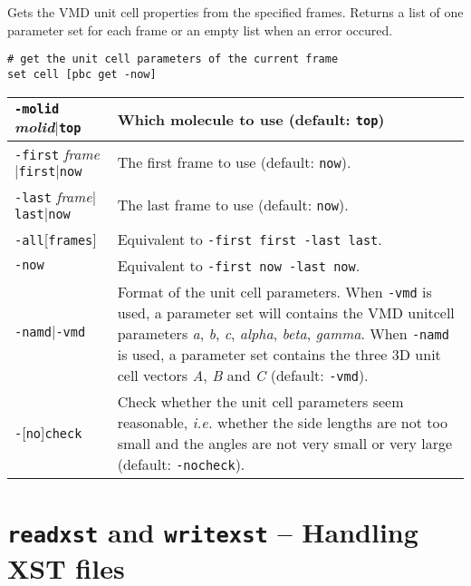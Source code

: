 \documentclass[a4paper, DIV12]{scrartcl}
\newcommand{\ie}{\emph{i.e.}\xspace}
\begin{document}
Gets the VMD unit cell properties from the specified frames. Returns a
list of one parameter set for each frame or an empty list when an
error occured.


\begin{Verbatim}
# get the unit cell parameters of the current frame
set cell [pbc get -now]
\end{Verbatim}


\begin{tabular}{|p{}|p{}|}
\hline

\texttt{-molid} \textit{molid}$|$\texttt{top}
& Which molecule to use (default: \texttt{top})
\\ \hline

\texttt{-first} \textit{frame}$|$\texttt{first}$|$\texttt{now}
&  The first frame to use (default: \texttt{now}).
\\ \hline

\texttt{-last} \textit{frame}$|$\texttt{last}$|$\texttt{now}
& The last frame to use (default: \texttt{now}).
\\ \hline

\texttt{-all}[\texttt{frames}]
& Equivalent to \texttt{-first first -last last}.
\\ \hline

\texttt{-now}
& Equivalent to \texttt{-first now -last now}.
\\ \hline

\texttt{-namd}$|$\texttt{-vmd}
& Format of the unit cell parameters. When \texttt{-vmd}
is used, a parameter set will contains the VMD unitcell
parameters \textit{a}, \textit{b}, \textit{c}, \textit{alpha},
\textit{beta}, \textit{gamma}. When \texttt{-namd} is used, a
parameter set contains the three 3D unit cell vectors \textit{A},
\textit{B} and \textit{C} (default: \texttt{-vmd}).
\\ \hline  

\texttt{-}[\texttt{no}]\texttt{check}
& Check whether the unit cell parameters seem reasonable, \ie whether
the side lengths are not too small and the angles are not very small
or very large (default: \texttt{-nocheck}).
\\ \hline  

\end{tabular}

\newpage
\section{\texttt{readxst} and \texttt{writexst} -- Handling XST files}
\label{sec:writexst}
\label{sec:readxst}
\end{document}
